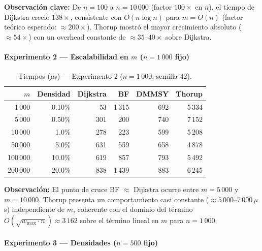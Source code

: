 \noindent\textbf{Observación clave:} De $n=100$ a $n=10\,000$ (factor
$100\times$ en $n$), el tiempo de Dijkstra creció $138\times$, consistente
con $O(n\log n)$ para $m=O(n)$ (factor teórico esperado: $\approx 200\times$).
Thorup mostró el mayor crecimiento absoluto ($\approx 54\times$) con un
overhead constante de $\approx 35$--$40\times$ sobre Dijkstra.

\paragraph{Experimento 2 — Escalabilidad en $m$ ($n=1\,000$ fijo)}

\begin{table}[t]
  \centering
  \caption{Tiempos ($\mu$s) — Experimento 2 ($n=1\,000$, semilla 42).}
  \label{tab:exp2}
  \small
  \begin{tabular}{rrrrrr}
    \toprule
    \textbf{$m$} & \textbf{Densidad} &
    \textbf{Dijkstra} & \textbf{BF} & \textbf{DMMSY} & \textbf{Thorup} \\
    \midrule
    1\,000   & 0.10\% & 53  & 1\,315 & 692 & 5\,334 \\
    5\,000   & 0.50\% & 301 & 200    & 740 & 7\,152 \\
    10\,000  & 1.0\%  & 278 & 223    & 599 & 5\,208 \\
    50\,000  & 5.0\%  & 631 & 559    & 658 & 4\,878 \\
    100\,000 & 10.0\% & 619 & 857    & 793 & 5\,492 \\
    200\,000 & 20.0\% & 838 & 1\,439 & 883 & 6\,245 \\
    \bottomrule
  \end{tabular}
\end{table}

\noindent\textbf{Observación:} El punto de cruce BF $\approx$ Dijkstra
ocurre entre $m=5\,000$ y $m=10\,000$. Thorup presenta un comportamiento
casi constante ($\approx 5\,000$--$7\,000\,\mu$s) independiente de $m$,
coherente con el dominio del término $O(\sqrt{w_{\max}\cdot n}) \approx 3\,162$
sobre el término lineal en $m$ para $n=1\,000$.

\paragraph{Experimento 3 — Densidades ($n=500$ fijo)}

